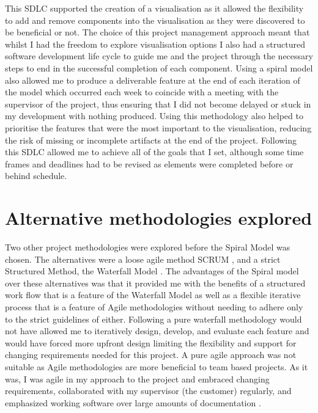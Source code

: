 This SDLC supported the creation of a visualisation as
it allowed the flexibility to add and remove components into the visualisation
as they were discovered to be beneficial or not. The choice of this project management approach
meant that whilst I had the freedom to explore visualisation options I also had
a structured software development life cycle to guide me and the project through
the necessary steps to end in the successful completion of each
component.
%
Using a spiral model also allowed me to produce a deliverable feature at the end
of each iteration of the model which occurred each week to coincide with a
meeting with the supervisor of the project, thus ensuring that I did not become delayed or stuck
in my development with nothing produced. Using this methodology also
helped to prioritise the features that were the most important to the
visualisation, reducing the risk of missing or incomplete
artifacts at the end of the project. 
Following this SDLC allowed me to achieve all of the goals
that I set, although some time frames and deadlines had to be revised as elements were completed before or behind schedule. 


\section{Alternative methodologies explored}
Two other project methodologies were explored before the
Spiral Model was chosen. The alternatives were a loose agile method SCRUM \cite{schwaber2004agile}, and
a strict Structured Method, the Waterfall Model \cite{royce1970managing}. 
The advantages of the Spiral model over these alternatives was that it provided
me with the benefits of a structured work flow that is a feature of the
Waterfall Model as
well as a flexible iterative process that is a feature of Agile methodologies
without needing to adhere only to the strict guidelines of either. Following a
pure waterfall methodology would not have allowed me to iteratively
design, develop, and evaluate each feature and would have forced more upfront
design limiting the flexibility and support for changing requirements 
needed for this project. A pure agile approach was not suitable as Agile methodologies are more
beneficial to team based projects. As it was,
I was agile in my approach to the project and embraced changing requirements,
collaborated with my supervisor (the customer) regularly, and emphasized working
software over large amounts of documentation \cite{beck2001agile}. 

